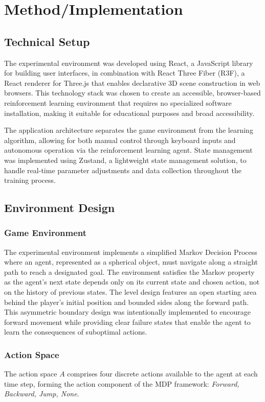 \section{Method/Implementation}

\subsection{Technical Setup}

The experimental environment was developed using React, a JavaScript library for building user interfaces, in combination with React Three Fiber (R3F), a React renderer for Three.js that enables declarative 3D scene construction in web browsers. This technology stack was chosen to create an accessible, browser-based reinforcement learning environment that requires no specialized software installation, making it suitable for educational purposes and broad accessibility.

The application architecture separates the game environment from the learning algorithm, allowing for both manual control through keyboard inputs and autonomous operation via the reinforcement learning agent. State management was implemented using Zustand, a lightweight state management solution, to handle real-time parameter adjustments and data collection throughout the training process.

\subsection{Environment Design}

\subsubsection{Game Environment}
The experimental environment implements a simplified Markov Decision Process where an agent, represented as a spherical object, must navigate along a straight path to reach a designated goal. The environment satisfies the Markov property as the agent's next state depends only on its current state and chosen action, not on the history of previous states. The level design features an open starting area behind the player's initial position and bounded sides along the forward path. This asymmetric boundary design was intentionally implemented to encourage forward movement while providing clear failure states that enable the agent to learn the consequences of suboptimal actions.

\subsubsection{Action Space}
The action space $A$ comprises four discrete actions available to the agent at each time step, forming the action component of the MDP framework: \textit{Forward, Backward, Jump, None}.

